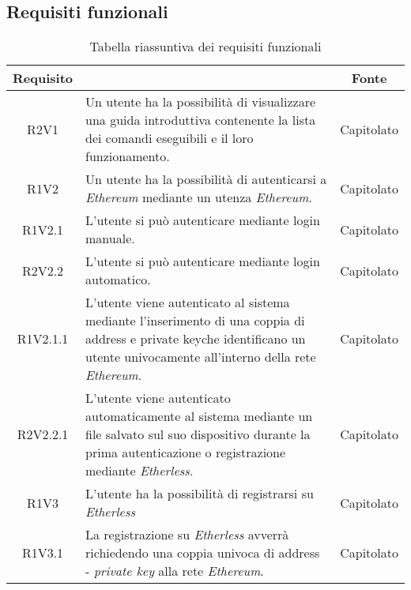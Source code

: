 \subsection{Requisiti funzionali}

\renewcommand{\arraystretch}{2.2}

\begin{longtable}{|c|p{8cm}|c|}
	
	\caption{Tabella riassuntiva dei requisiti funzionali}\\
	\hline
	\rowcolor{header}
	
	\textbf{Requisito} & \centering{\textbf{Descrizione}} & \textbf{Fonte}\\
	
	\hline
	
	R2V1 & Un utente ha la possibilità di visualizzare una guida introduttiva contenente la lista dei comandi eseguibili e il loro funzionamento. & Capitolato \\
	
	R1V2 & Un utente ha la possibilità di autenticarsi a \textit{Ethereum} mediante un utenza \textit{Ethereum\glos}. & Capitolato \\
	
	R1V2.1 & L'utente si può autenticare mediante login manuale.  & Capitolato \\
	
	R2V2.2 & L'utente si può autenticare mediante login automatico. & Capitolato \\
	
	R1V2.1.1 &  L'utente viene autenticato al sistema mediante l'inserimento di una coppia di address e private key\glo che identificano un utente univocamente all'interno della rete \textit{Ethereum\glos}. & Capitolato \\
	
	R2V2.2.1 &  L'utente viene autenticato automaticamente al sistema mediante un file salvato sul suo dispositivo durante la prima autenticazione o registrazione mediante \textit{Etherless}.  & Capitolato \\
	
	R1V3 &  L'utente ha la possibilità di registrarsi su \textit{Etherless}  & Capitolato \\

	R1V3.1 &  La registrazione su \textit{Etherless} avverrà richiedendo una coppia univoca di address - \textit{private key\glo} alla rete \textit{Ethereum\glos}.  & Capitolato \\	
	

\end{longtable}
